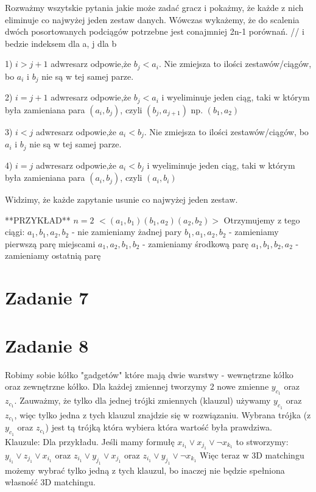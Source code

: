 \documentclass[12pt]{article}
\begin{document}
 Rozważmy wszytskie pytania jakie może zadać gracz i pokażmy, że każde z nich eliminuje co najwyżej jeden zestaw danych. Wówczas wykażemy, że do scalenia dwóch posortowanych podciągów potrzebne jest conajmniej 2n-1 porównań.
 // i bedzie indeksem dla a, j dla b
 
 1) $i>j+1$ adwresarz odpowie,że $b_j<a_i$. Nie zmiejsza to ilości zestawów/ciągów, bo $a_i$ i $b_j$ nie są w tej samej parze.
 
 2) $i=j+1$ adwresarz odpowie,że $b_j<a_i$ i wyeliminuje jeden ciąg, taki w którym była zamieniana para $(a_i, b_j)$, czyli $(b_j, a_{j+1})$  np. $(b_1, a_2)$
 
 3) $i<j$ adwresarz odpowie,że $a_i<b_j$. Nie zmiejsza to ilości zestawów/ciągów, bo $a_i$ i $b_j$ nie są w tej samej parze.

 4) $i=j$ adwresarz odpowie,że $a_i<b_j$ i wyeliminuje jeden ciąg, taki w którym była zamieniana para $(a_i,b_j)$, czyli $(a_i, b_i)$
 
Widzimy, że każde zapytanie usunie co najwyżej jeden zestaw. 

**PRZYKŁAD**
$n = 2$
$<(a_1, b_1)(b_1, a_2)(a_2, b_2)>$
Otrzymujemy z tego ciągi:
$a_1, b_1, a_2, b_2$ - nie zamieniamy żadnej pary
$b_1, a_1, a_2, b_2$ - zamieniamy pierwszą parę miejscami
$a_1, a_2, b_1, b_2$ - zamieniamy środkową parę
$a_1, b_1, b_2, a_2$ - zamieniamy ostatnią parę

\section{Zadanie 7}

\section{Zadanie 8}

Robimy sobie kółko "gadgetów" które mają dwie warstwy - wewnętrzne kółko oraz zewnętrzne kółko.
Dla każdej zmiennej tworzymy 2 nowe zmienne $y_{c_1}$ oraz $z_{c_1}$. Zauważmy, że tylko dla jednej trójki zmiennych (klauzul) używamy $y_{c_1}$ oraz $z_{c_1}$, więc tylko jedna z tych klauzul znajdzie się w rozwiązaniu. Wybrana trójka (z $y_{c_1}$ oraz $z_{c_1}$) jest tą trójką która wybiera która wartość była prawdziwa. \\
Klauzule:
Dla przykładu. Jeśli mamy formułę $x_{i_1} \lor x_{j_1} \lor \lnot x_{k_1}$ to stworzymy:
$y_{i_1} \lor z_{j_1} \lor x_{i_1}$ oraz $z_{i_1} \lor y_{j_1} \lor x_{j_1}$ oraz $z_{i_1} \lor y_{j_1} \lor \lnot x_{k_1}$  
Więc teraz w 3D matchingu możemy wybrać tylko jedną z tych klauzul, bo inaczej nie będzie spełniona własność 3D matchingu.\\
\end{document}
